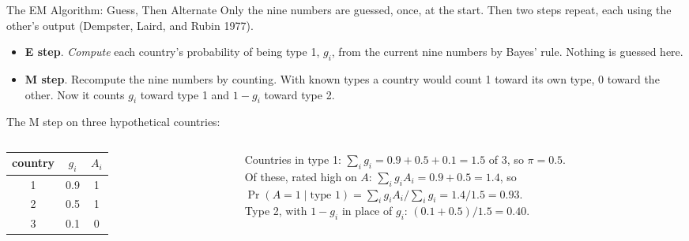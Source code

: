 \documentclass[aspectratio=169,11pt,xcolor=dvipsnames]{beamer}
\begin{document}
\begin{frame}{The EM Algorithm: Guess, Then Alternate}
Only the nine numbers are guessed, once, at the start. Then two steps repeat, each using the
other's output (Dempster, Laird, and Rubin 1977).
\begin{itemize}\itemsep3pt
  \item \textbf{E step}. \emph{Compute} each country's probability of being type 1, $g_i$, from the
        current nine numbers by Bayes' rule. Nothing is guessed here.
  \item \textbf{M step}. Recompute the nine numbers by counting. With known types a country
        would count 1 toward its own type, 0 toward the other. Now it counts $g_i$ toward type 1
        and $1 - g_i$ toward type 2.
\end{itemize}
\vskip4pt
The M step on three hypothetical countries:
\begin{columns}[c]
\begin{column}{0.30\linewidth}
\begin{center}\small
\renewcommand{\arraystretch}{1.05}
\begin{tabular}{@{}ccc@{}}
\toprule
country & $g_i$ & $A_i$ \\
\midrule
1 & 0.9 & 1 \\
2 & 0.5 & 1 \\
3 & 0.1 & 0 \\
\bottomrule
\end{tabular}
\end{center}
\end{column}
\begin{column}{0.68\linewidth}
\small
Countries in type 1: $\sum_i g_i = 0.9 + 0.5 + 0.1 = 1.5$ of 3, so $\pi = 0.5$.\\[4pt]
Of these, rated high on $A$: $\sum_i g_i A_i = 0.9 + 0.5 = 1.4$, so\\
$\Pr(A = 1 \mid \text{type 1}) = \sum_i g_i A_i / \sum_i g_i = 1.4 / 1.5 = 0.93$.\\[4pt]
Type 2, with $1 - g_i$ in place of $g_i$: $(0.1 + 0.5) / 1.5 = 0.40$.
\end{column}
\end{columns}
\end{frame}
\end{document}
